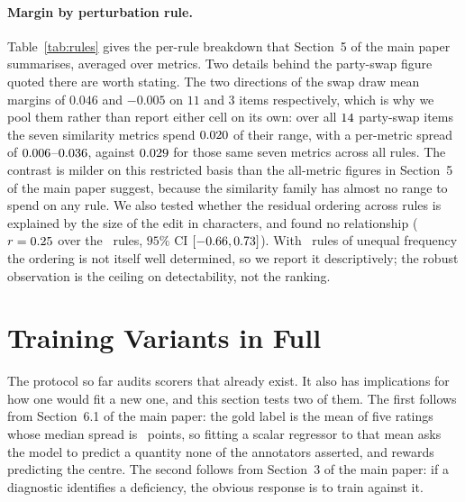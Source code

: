 \documentclass[11pt]{article}
\begin{document}
\paragraph{Margin by perturbation rule.}
Table~\ref{tab:rules} gives the per-rule breakdown that Section~5 of the main paper
summarises, averaged over metrics. Two details behind the party-swap figure
quoted there are worth stating. The two directions of the swap draw mean margins
of $0.046$ and $-0.005$ on $11$ and $3$ items respectively, which is why we pool
them rather than report either cell on its own: over all $14$ party-swap
items the seven similarity metrics spend $0.020$ of their range, with a
per-metric spread of $0.006$--$0.036$, against
$0.029$ for those same seven metrics across all rules. The
contrast is milder on this restricted basis than the all-metric figures in
Section~5 of the main paper suggest, because the similarity family has almost no
range to spend on any rule. We also tested whether
the residual ordering across rules is explained by the size of the edit in
characters, and found no relationship ($r=0.25$ over the \nRules\ rules,
$95\%$ CI $[-0.66, 0.73]$). With \nRules\ rules of unequal
frequency the ordering is not itself well determined, so we report it
descriptively; the robust observation is the ceiling on detectability, not the
ranking.

\begin{table}[t]\centering\small

\caption{\textsc{LegalEdit} margin by perturbation rule, averaged over the
metrics in Table~1 of the main paper. \emph{worst metric} is the lowest margin
any single metric assigns that rule. A margin of $1$ would mean the metric
treats a legally flipped sentence exactly as it treats an unrelated one.}
\label{tab:rules}
\end{table}

\section{Training Variants in Full}
\label{app:variants}
\label{sec:objectives}

The protocol so far audits scorers that already exist. It also has implications
for how one would fit a new one, and this section tests two of them. The first
follows from Section~6.1 of the main paper: the gold label is the mean of five ratings
whose median spread is \medianRange\ points, so fitting a scalar regressor to
that mean asks the model to predict a quantity none of the annotators asserted,
and rewards predicting the centre. The second follows from
Section~3 of the main paper: if a diagnostic identifies a deficiency, the obvious
response is to train against it.
\end{document}
